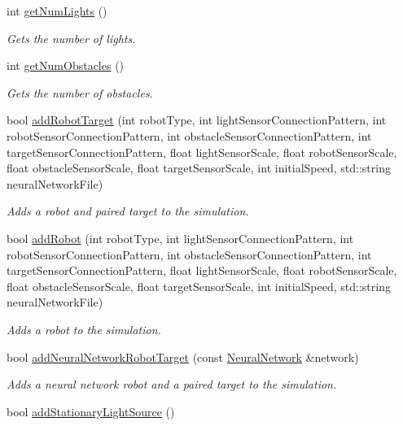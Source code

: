 \begin{DoxyCompactItemize}
int \hyperlink{namespaceutil_aa562d1964b9fef18a6001d8fed63100d}{get\-Num\-Lights} ()
\begin{DoxyCompactList}\small\item\em Gets the number of lights. \end{DoxyCompactList}\item 
int \hyperlink{namespaceutil_a63bc8a24e2203d0771fb75432296b06c}{get\-Num\-Obstacles} ()
\begin{DoxyCompactList}\small\item\em Gets the number of obstacles. \end{DoxyCompactList}\item 
bool \hyperlink{namespaceutil_ab3eebe9c6924888ecf5d29b2f871fbce}{add\-Robot\-Target} (int robot\-Type, int light\-Sensor\-Connection\-Pattern, int robot\-Sensor\-Connection\-Pattern, int obstacle\-Sensor\-Connection\-Pattern, int target\-Sensor\-Connection\-Pattern, float light\-Sensor\-Scale, float robot\-Sensor\-Scale, float obstacle\-Sensor\-Scale, float target\-Sensor\-Scale, int initial\-Speed, std\-::string neural\-Network\-File)
\begin{DoxyCompactList}\small\item\em Adds a robot and paired target to the simulation. \end{DoxyCompactList}\item 
bool \hyperlink{namespaceutil_a22f8c077027e25734041006f8d94fd18}{add\-Robot} (int robot\-Type, int light\-Sensor\-Connection\-Pattern, int robot\-Sensor\-Connection\-Pattern, int obstacle\-Sensor\-Connection\-Pattern, int target\-Sensor\-Connection\-Pattern, float light\-Sensor\-Scale, float robot\-Sensor\-Scale, float obstacle\-Sensor\-Scale, float target\-Sensor\-Scale, int initial\-Speed, std\-::string neural\-Network\-File)
\begin{DoxyCompactList}\small\item\em Adds a robot to the simulation. \end{DoxyCompactList}\item 
bool \hyperlink{namespaceutil_adecaea7e94744f17eb1000727b8c3e73}{add\-Neural\-Network\-Robot\-Target} (const \hyperlink{classNeuralNetwork}{Neural\-Network} \&network)
\begin{DoxyCompactList}\small\item\em Adds a neural network robot and a paired target to the simulation. \end{DoxyCompactList}\item 
bool \hyperlink{namespaceutil_a4db9ace4269226be8f99f3718279dd51}{add\-Stationary\-Light\-Source} ()

\end{DoxyCompactItemize}
